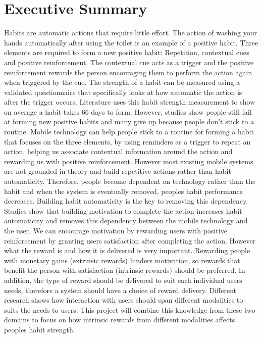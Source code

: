 \section*{Executive Summary}
Habits are automatic actions that require little effort. The action of washing your hands automatically after using the toilet is an example of a positive habit. Three elements are required to form a new positive habit: Repetition, contextual cues and positive reinforcement. The contextual cue acts as a trigger and the positive reinforcement rewards the person encouraging them to perform the action again when triggered by the cue. The strength of a habit can be measured using a validated questionnaire that specifically looks at how automatic the action is after the trigger occurs. Literature uses this habit strength measurement to show on average a habit takes 66 days to form. However, studies show people still fail at forming new positive habits and many give up because people don't stick to a routine.\newline
\newline
Mobile technology can help people stick to a routine for forming a habit that focuses on the three elements, by using reminders as a trigger to repeat an action, helping us associate contextual information around the action and rewarding us with positive reinforcement. However most existing mobile systems are not grounded in theory and build repetitive actions rather than habit automaticity. Therefore, people become dependent on technology rather than the habit and when the system is eventually removed, peoples habit performance decreases.\newline
\newline
Building habit automaticity is the key to removing this dependency. Studies show that building motivation to complete the action increases habit automaticity and removes this dependency between the mobile technology and the user. We can encourage motivation by rewarding users with positive reinforcement by granting users satisfaction after completing the action. However what the reward is and how it is delivered is very important. Rewarding people with monetary gains (extrinsic rewards) hinders motivation, so rewards that benefit the person with satisfaction (intrinsic rewards) should be preferred. In addition, the type of reward should be delivered to suit each individual users needs, therefore a system should have a choice of reward delivery. Different research shows how interaction with users should span different modalities to suits the needs to users. This project will combine this knowledge from these two domains to focus on how intrinsic rewards from different modalities affects peoples habit strength.\newline
